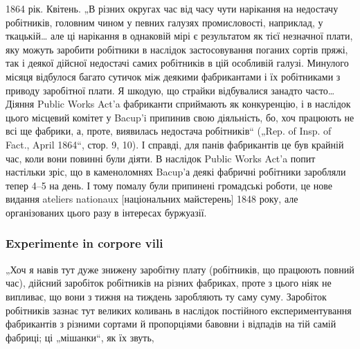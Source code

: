 1864 рік. Квітень. „В різних округах час від часу чути нарікання
на недостачу робітників, головним чином у певних галузях
промисловості, наприклад, у ткацькій\dots{} але ці нарікання в однаковій
мірі є результатом як тієї незначної плати, яку можуть заробити
робітники в наслідок застосовування поганих сортів пряжі,
так і деякої дійсної недостачі самих робітників в цій особливій
галузі. Минулого місяця відбулося багато сутичок між деякими
фабрикантами і їх робітниками з приводу заробітної плати.
Я шкодую, що страйки відбувалися занадто часто\dots{} Діяння
Public Works Act’a фабриканти сприймають як конкуренцію,
і в наслідок цього місцевий комітет у Bacup’i припинив свою
діяльність, бо, хоч працюють не всі ще фабрики, а, проте, виявилась
недостача робітників“ („Rep. of Insp. of Fact., April 1864“,
стор. 9, 10). І справді, для панів фабрикантів це був крайній
час, коли вони повинні були діяти. В наслідок Public Works
Act’a попит настільки зріс, що в каменоломнях Bacup’а деякі
фабричні робітники заробляли тепер 4--5 на день.
І тому помалу були припинені громадські роботи, це нове видання
ateliers nationaux [національних майстерень] 1848 року,
але організованих цього разу в інтересах буржуазії.

\subsubsection[Experimente in corpore vili]{Experimente in corpore vili\footnotemarkZ{}}

„Хоч
я навів тут дуже знижену заробітну плату (робітників,
що працюють повний час), дійсний заробіток робітників на
різних фабриках, проте з цього ніяк не випливає, що вони
з тижня на тиждень заробляють ту саму суму. Заробіток робітників
зазнає тут великих коливань в наслідок постійного експериментування
фабрикантів з різними сортами й пропорціями бавовни
і відпадів на тій самій фабриці; ці „мішанки“, як їх звуть,
\parbreak{}  %

